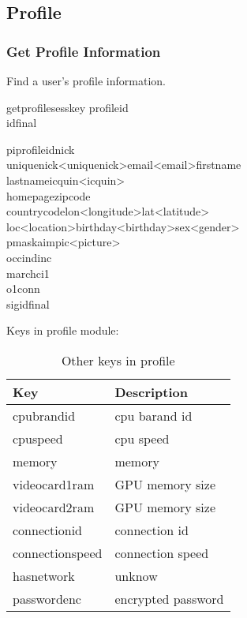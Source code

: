\documentclass[oneside,titlepage,a4paper]{Definition/retrospy} %
\begin{document}
\subsection{Profile}
\subsubsection{Get Profile Information}
Find a user's profile information.
\ClientRequest

\begin{mybox}
	\tbs getprofile\tbs\tbs sesskey\tbs <session key>
	\tbs profileid\tbs <profile id>\\\tbs id\tbs <operation id>\tbs final\tbs
\end{mybox}
\ServerResponse

\begin{mybox}
	\tbs pi\tbs\tbs profileid\tbs <profile id>\tbs nick\tbs <nick name>\\\tbs uniquenick\tbs <uniquenick>\tbs email\tbs<email>\tbs firstname\tbs<first name>\\
	\tbs lastname\tbs <last name>\tbs icquin\tbs<icquin>\\
	\tbs homepage\tbs<home page URL>\tbs zipcode\tbs<zip code>\\
	\tbs countrycode\tbs<country code>\tbs lon\tbs <longitude>\tbs lat\tbs<latitude>\\
	\tbs loc\tbs<location>\tbs birthday\tbs<birthday>\tbs sex\tbs<gender>\\
	\tbs pmask\tbs<public mask>\tbs aim\tbs<aim name>\tbs pic\tbs <picture>\\
	\tbs occ\tbs<occupation id>\tbs ind\tbs<industry id>\tbs inc\tbs<income id>\\
	\tbs mar\tbs<married id>\tbs chc\tbs<child count number>\tbs i1\tbs<interest 1>\\
	\tbs  o1\tbs<ownership 1>\tbs conn\tbs<connection type id>\\
	\tbs sig\tbs<peer to peer signature>\tbs id\tbs <operation id>\tbs final\tbs
\end{mybox}

Keys in profile module:
\begin{table}[H]
	\centering
	\begin{tabular}{|l|l|}
		\hline 
		\textbf{Key}&\textbf{Description} \\ 
		\hline 
		cpubrandid&            cpu barand id\\\hline
		cpuspeed& cpu speed\\\hline
		memory&memory\\\hline
		videocard1ram& GPU memory size\\\hline
		videocard2ram& GPU memory size\\\hline
		connectionid&connection id\\\hline
		connectionspeed&connection speed\\\hline
		hasnetwork& unknow\\\hline
		passwordenc& encrypted password\\\hline
	\end{tabular} 
	\caption{Other keys in profile}
	\label{Other keys in profile}
\end{table}
\end{document}
